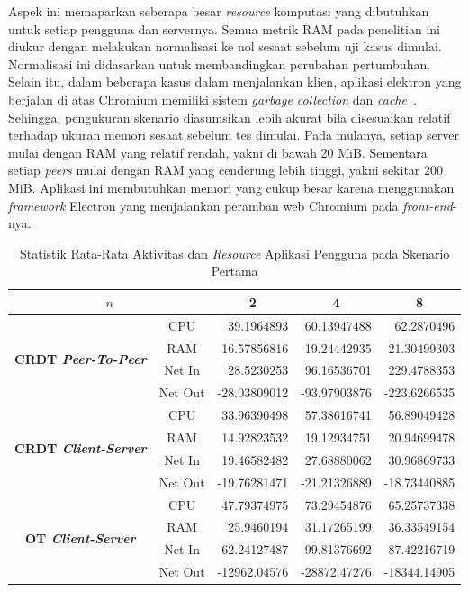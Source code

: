 Aspek ini memaparkan seberapa besar \textit{resource} komputasi yang dibutuhkan untuk setiap pengguna dan servernya. Semua metrik RAM pada penelitian ini diukur dengan melakukan normalisasi ke nol sesaat sebelum uji kasus dimulai. Normalisasi ini didasarkan untuk membandingkan perubahan pertumbuhan. Selain itu, dalam beberapa kasus dalam menjalankan klien, aplikasi elektron yang berjalan di atas Chromium memiliki sistem \textit{garbage collection} dan \textit{cache}~\citep{chromium}. Sehingga, pengukuran skenario diasumsikan lebih akurat bila disesuaikan relatif terhadap ukuran memori sesaat sebelum tes dimulai. Pada mulanya, setiap server mulai dengan RAM yang relatif rendah, yakni di bawah 20 MiB. Sementara setiap \textit{peers} mulai dengan RAM yang cenderung lebih tinggi, yakni sekitar 200 MiB. Aplikasi ini membutuhkan memori yang cukup besar karena menggunakan \textit{framework} Electron yang menjalankan peramban web Chromium pada \textit{front-end}-nya.

\begin{table}[H]
 \centering

 \caption{Statistik Rata-Rata Aktivitas dan \textit{Resource} Aplikasi Pengguna pada Skenario Pertama}
 \label{tab:resource-client-1}
 \begin{tabular}{|cc|r|r|r|}
  \hline
\multicolumn{2}{|c|}{$n$} & \multicolumn{1}{c|}{\textbf{2}} & \multicolumn{1}{c|}{\textbf{4}} & \multicolumn{1}{c|}{\textbf{8}} \\ \hline
\multicolumn{1}{|c|}{\multirow{4}{*}{\textbf{CRDT \textit{Peer-To-Peer}}}} & CPU & 39.1964893 & 60.13947488 & 62.2870496 \\ \cline{2-5}
\multicolumn{1}{|c|}{} & RAM & 16.57856816 & 19.24442935 & 21.30499303 \\ \cline{2-5}
\multicolumn{1}{|c|}{} & Net In & 28.5230253 & 96.16536701 & 229.4788353 \\ \cline{2-5}
\multicolumn{1}{|c|}{} & Net Out & -28.03809012 & -93.97903876 & -223.6266535 \\ \hline
\multicolumn{1}{|c|}{\multirow{4}{*}{\textbf{CRDT \textit{Client-Server}}}} & CPU & 33.96390498 & 57.38616741 & 56.89049428 \\ \cline{2-5}
\multicolumn{1}{|c|}{} & RAM & 14.92823532 & 19.12934751 & 20.94699478 \\ \cline{2-5}
\multicolumn{1}{|c|}{} & Net In & 19.46582482 & 27.68880062 & 30.96869733 \\ \cline{2-5}
\multicolumn{1}{|c|}{} & Net Out & -19.76281471 & -21.21326889 & -18.73440885 \\ \hline
\multicolumn{1}{|c|}{\multirow{4}{*}{\textbf{OT \textit{Client-Server}}}} & CPU & 47.79374975 & 73.29454876 & 65.25737338 \\ \cline{2-5}
\multicolumn{1}{|c|}{} & RAM & 25.9460194 & 31.17265199 & 36.33549154 \\ \cline{2-5}
\multicolumn{1}{|c|}{} & Net In & 62.24127487 & 99.81376692 & 87.42216719 \\ \cline{2-5}
\multicolumn{1}{|c|}{} & Net Out & -12962.04576 & -28872.47276 & -18344.14905 \\ \hline
\end{tabular}
\end{table}

